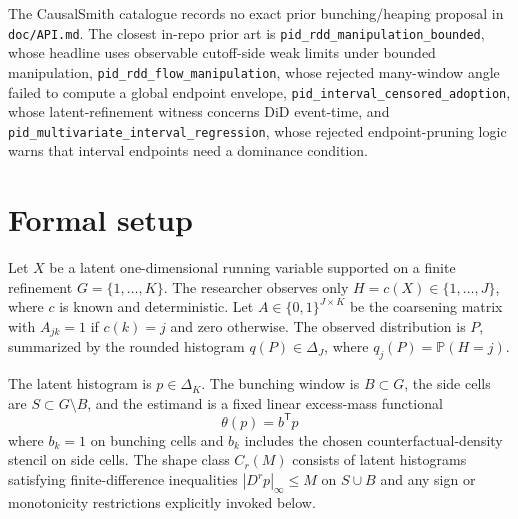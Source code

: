 \documentclass[11pt]{article}
\renewcommand{\Pr}{\mathbb{P}}
\newcommand{\transpose}{\mathsf{T}}
\theoremstyle{definition}
\theoremstyle{plain}
\theoremstyle{remark}
\begin{document}
The CausalSmith catalogue records no exact prior bunching/heaping proposal in \texttt{doc/API.md}. The closest in-repo prior art is \texttt{pid\_rdd\_manipulation\_bounded}, whose headline uses observable cutoff-side weak limits under bounded manipulation, \texttt{pid\_rdd\_flow\_manipulation}, whose rejected many-window angle failed to compute a global endpoint envelope, \texttt{pid\_interval\_censored\_adoption}, whose latent-refinement witness concerns DiD event-time, and \texttt{pid\_multivariate\_interval\_regression}, whose rejected endpoint-pruning logic warns that interval endpoints need a dominance condition.

\section{Formal setup}
Let $X$ be a latent one-dimensional running variable supported on a finite refinement $G=\{1,\ldots,K\}$. The researcher observes only $H=c(X)\in\{1,\ldots,J\}$, where $c$ is known and deterministic. Let $A\in\{0,1\}^{J\times K}$ be the coarsening matrix with $A_{jk}=1$ if $c(k)=j$ and zero otherwise. The observed distribution is $P$, summarized by the rounded histogram $q(P)\in\Delta_J$, where $q_j(P)=\Pr(H=j)$.

The latent histogram is $p\in\Delta_K$. The bunching window is $B\subset G$, the side cells are $S\subset G\setminus B$, and the estimand is a fixed linear excess-mass functional
\[
  \theta(p)=b^\transpose p
\]
where $b_k=1$ on bunching cells and $b_k$ includes the chosen counterfactual-density stencil on side cells. The shape class $C_r(M)$ consists of latent histograms satisfying finite-difference inequalities $|D^r p|_\infty\le M$ on $S\cup B$ and any sign or monotonicity restrictions explicitly invoked below.
\end{document}
